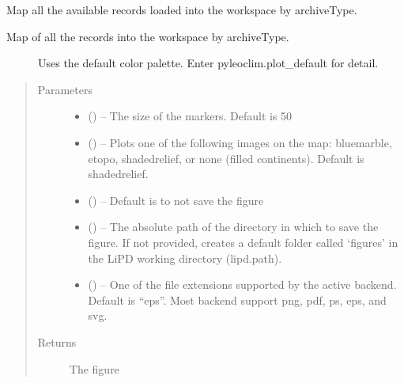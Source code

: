 \documentclass[letterpaper,10pt,english]{sphinxmanual}
\begin{document}
\begin{fulllineitems}
\label{\detokenize{Main:pyleoclim.mapAllArchive}}
Map all the available records loaded into the workspace by archiveType.
\begin{description}
\item[{Map of all the records into the workspace by archiveType.}] \leavevmode
Uses the default color palette. Enter pyleoclim.plot\_default for detail.

\end{description}
\begin{quote}\begin{description}
\item[{Parameters}] \leavevmode\begin{itemize}
\item {} 
 () -- The size of the markers. Default is 50

\item {} 
 () -- Plots one of the following images on the map:
bluemarble, etopo, shadedrelief, or none (filled continents).
Default is shadedrelief.

\item {} 
 () -- Default is to not save the figure

\item {} 
 () -- The absolute path of the directory in which to save the
figure. If not provided, creates a default folder called `figures'
in the LiPD working directory (lipd.path).

\item {} 
 () -- One of the file extensions supported by the active
backend. Default is ``eps''. Most backend support png, pdf, ps, eps,
and svg.

\end{itemize}

\item[{Returns}] \leavevmode
The figure

\end{description}\end{quote}

\end{fulllineitems}
\end{document}
